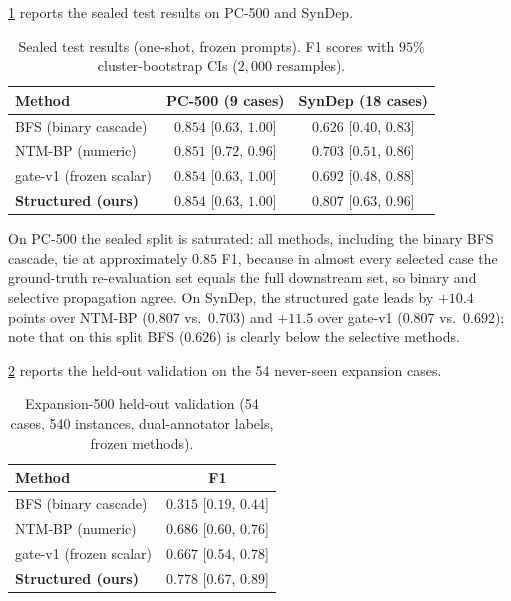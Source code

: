 \documentclass{article}
\theoremstyle{definition}
\begin{document}
\cref{tab:sealed} reports the sealed test results on PC-500 and
SynDep.

\begin{table}[t]
\centering
\caption{Sealed test results (one-shot, frozen prompts).  F1 scores
with $95\%$ cluster-bootstrap CIs ($2{,}000$ resamples).}
\label{tab:sealed}
\begin{tabular}{lcc}
\toprule
Method & PC-500 (9 cases) & SynDep (18 cases) \\
\midrule
BFS (binary cascade)        & $0.854$ [$0.63$, $1.00$] & $0.626$ [$0.40$, $0.83$] \\
NTM-BP (numeric)            & $0.851$ [$0.72$, $0.96$] & $0.703$ [$0.51$, $0.86$] \\
gate-v1 (frozen scalar)     & $0.854$ [$0.63$, $1.00$] & $0.692$ [$0.48$, $0.88$] \\
\textbf{Structured (ours)}  & $\mathbf{0.854}$ [$0.63$, $1.00$] &
                              $\mathbf{0.807}$ [$0.63$, $0.96$] \\
\bottomrule
\end{tabular}
\end{table}

On PC-500 the sealed split is saturated: all methods, including the
binary BFS cascade, tie at approximately $0.85$ F1, because in almost
every selected case the ground-truth re-evaluation set equals the full
downstream set, so binary and selective propagation agree.  On SynDep,
the structured gate leads by $+10.4$ points over NTM-BP ($0.807$ vs.\
$0.703$) and $+11.5$ over gate-v1 ($0.807$ vs.\ $0.692$); note that on
this split BFS ($0.626$) is clearly below the selective methods.

\cref{tab:expansion} reports the held-out validation on the 54
never-seen expansion cases.

\begin{table}[t]
\centering
\caption{Expansion-500 held-out validation (54 cases, 540 instances,
  dual-annotator labels, frozen methods).}
\label{tab:expansion}
\begin{tabular}{lc}
\toprule
Method & F1 \\
\midrule
BFS (binary cascade)        & $0.315$ [$0.19$, $0.44$] \\
NTM-BP (numeric)            & $0.686$ [$0.60$, $0.76$] \\
gate-v1 (frozen scalar)     & $0.667$ [$0.54$, $0.78$] \\
\textbf{Structured (ours)}  & $\mathbf{0.778}$ [$0.67$, $0.89$] \\
\bottomrule
\end{tabular}
\end{table}
\end{document}
